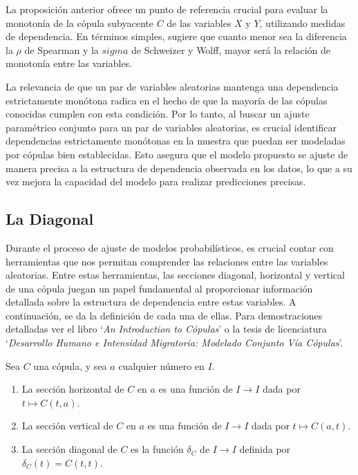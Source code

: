 La proposición anterior ofrece un punto de referencia crucial para evaluar la monotonía de la cópula subyacente $C$ de las variables $X$ y $Y$, utilizando medidas de dependencia. En términos simples, sugiere que cuanto menor sea la diferencia la $\rho$ de Spearman y la $sigma$ de Schweizer y Wolff, mayor será la relación de monotonía entre las variables.

La relevancia de que un par de variables aleatorias mantenga una dependencia estrictamente monótona radica en el hecho de que la mayoría de las cópulas conocidas cumplen con esta condición. Por lo tanto, al buscar un ajuste paramétrico conjunto para un par de variables aleatorias, es crucial identificar dependencias estrictamente monótonas en la muestra que puedan ser modeladas por cópulas bien establecidas. Esto asegura que el modelo propuesto se ajuste de manera precisa a la estructura de dependencia observada en los datos, lo que a su vez mejora la capacidad del modelo para realizar predicciones precisas. \cite[pág. 43]{TesisEmanuel}



\subsection{La Diagonal}

Durante el proceso de ajuste de modelos probabilísticos, es crucial contar con herramientas que nos permitan comprender las relaciones entre las variables aleatorias. Entre estas herramientas, las secciones diagonal, horizontal y vertical de una cópula juegan un papel fundamental al proporcionar información detallada sobre la estructura de dependencia entre estas variables. A continuación, se da la definición de cada una de ellas. Para demostraciones detalladas ver el libro `\textit{An Introduction to Cópulas}' \cite{nelsenintroduction} o la tesis de licenciatura `\textit{Desarrollo Humano e Intensidad Migratoria: Modelado Conjunto Vía Cópulas}'.

\begin{defn}
    Sea $C$ una cópula, y sea $a$ cualquier número en $I$. 
    \begin{enumerate}
        \item La sección horizontal de $C$ en $a$ es una función de $I \to I$ dada por $ t \mapsto C(t, a)$. 
        \item La sección vertical de $C$ en $a$ es una función de $I \to I$ dada por $ t \mapsto C(a, t)$.
        \item La sección diagonal de $C$ es la función $\delta_C$ de $I \to I$ definida por $\delta_C(t) = C(t,t)$.
    \end{enumerate}
\end{defn}

